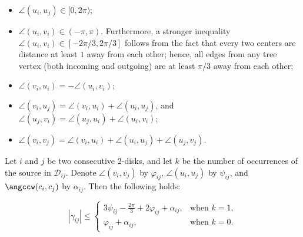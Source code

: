 \begin{itemize}
\item $\angle(u_i, u_j)\in[0, 2\pi)$;
\item $\angle(u_i, v_i)\in(-\pi, \pi)$. Furthermore, a stronger inequality $\angle(u_i, v_i)\in[-2\pi/3, 2\pi/3]$ follows from the fact that every two centers are distance at least $1$ away from each other; hence, all edges from any tree vertex (both incoming and outgoing) are at least $\pi/3$ away from each other;
\item $\angle(v_i, u_i) = -\angle(u_i, v_i)$;
\item $\angle(v_i, u_j) = \angle(v_i, u_i) + \angle(u_i, u_j)$, and $\angle(u_j, v_i) = \angle(u_j, u_i) + \angle(u_i, v_i)$;
\item $\angle(v_i, v_j) = \angle(v_i, u_i) + \angle(u_i, u_j) + \angle(u_j, v_j)$.
\end{itemize}



\begin{claim}
\label{lemma:can-construct}

Let $i$ and $j$ be two consecutive $2$-disks, and let $k$ be the number of occurrences of the source in $\mathcal{D}_{ij}$. Denote $\angle(v_i, v_j)$ by $\varphi_{ij}$, $\angle(u_i, u_j)$ by $\psi_{ij}$, and $\angccw(c_i, c_j)$ by $\alpha_{ij}$. Then the following holds:

\begin{equation}
\label{eq:curve_bound}
|\gamma_{ij}|\leq\begin{cases}
\displaystyle
3\psi_{ij} - \frac{2\pi}{3} + 2\varphi_{ij} + \alpha_{ij}, & \text{when }k = 1, \\
\varphi_{ij} + \alpha_{ij}, & \text{when }k = 0.
\end{cases}%
\end{equation}
\end{claim}


